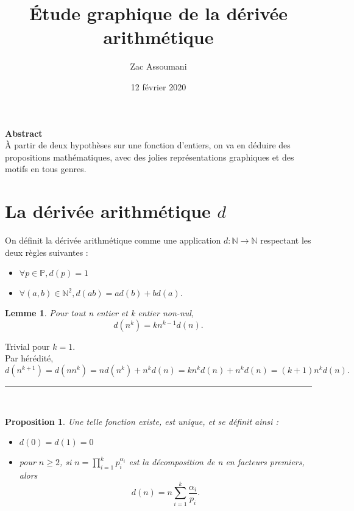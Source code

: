 \documentclass[a4paper, 12pt]{article}
\title {Étude graphique de la dérivée arithmétique}
\author{Zac Assoumani}
\date{12 février 2020}
\newcommand{\N}{\mathbb{N}}
\newcommand{\Pm}{\mathbb{P}}
\newcommand{\Prv}{\noindent{\it Preuve. }}
\newcommand{\cqfd}{\rule{0.2cm}{0.2cm}}
\newtheorem{prop}{Proposition}
\newtheorem{lem}{Lemme}
\begin{document}
\maketitle

\begin{adjustwidth}{60pt}{60pt}
\begin{center}{\bf Abstract} \\
À partir de deux hypothèses sur une fonction d'entiers, on va en déduire des propositions mathématiques, avec des jolies représentations graphiques et des motifs en tous genres. \\
\end{center}
\end{adjustwidth}

\tableofcontents

\section{La dérivée arithmétique $d$}
On définit la dérivée arithmétique comme une application $d: \N \longrightarrow \N$ respectant les deux règles suivantes :
\begin{itemize}
\item
 $\forall p \in \Pm, d(p)=1$
 \item
 $\forall (a,b) \in \N^{2}, d(ab)=ad(b)+bd(a).$ \\
 \end{itemize}

\begin{lem} \label{lem1}
Pour tout n entier et k entier non-nul,
\[d(n^{k})=kn^{k-1}d(n). \]
\end{lem}
\Prv Trivial pour $k=1$.\\
Par hérédité, $d(n^{k+1}) = d(nn^{k}) = nd(n^{k})+n^{k}d(n) = kn^{k}d(n)+n^{k}d(n) = (k+1)n^{k}d(n).$  \cqfd \\


\begin{prop} \label{prop1}
Une telle fonction existe, est unique, et se définit ainsi :
\begin{itemize}
\item
$d(0)=d(1)=0$
\item
pour $n \ge 2$, si $n=\prod_{i=1}^{k} p_i^{\alpha_i}$ est la décomposition de n en facteurs premiers, alors
\begin{equation} \label{eq1}d(n)=n\sum_{i=1}^{k} \frac{\alpha_i}{p_i}. \end{equation}
\end{itemize}
\end{prop}
\end{document}
